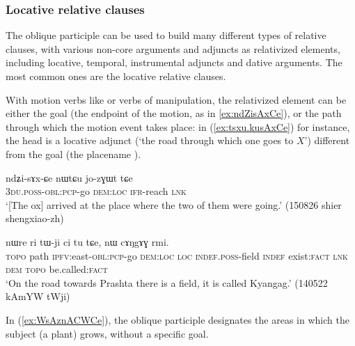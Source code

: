 \subsubsection{Locative relative clauses} \label{sec:locative.participle.relatives}
The oblique participle can be used to build many different types of relative clauses, with various non-core arguments and adjuncts as relativized elements, including locative, temporal, instrumental adjuncts and dative arguments. The most common ones are the locative relative clauses.

With  motion verbs like  or verbs of manipulation, the relativized element can be either the goal (the endpoint of the motion, as in \ref{ex:ndZisAxCe}), or the path through which the motion event takes place: in (\ref{ex:tsxu.kusAxCe}) for instance, the head  is a locative adjunct (`the road through which one goes to $X$') different from the goal (the placename ).

\begin{exe}
\ex \label{ex:ndZisAxCe}
\gll ndʑi-sɤx-ɕe nɯtɕu jo-zɣɯt tɕe \\
\textsc{3du}.\textsc{poss}-\textsc{obl}:\textsc{pcp}-go \textsc{dem}:\textsc{loc} \textsc{ifr}-reach \textsc{lnk} \\
\glt  `[The ox] arrived at the place where the two of them were going.' (150826 shier shengxiao-zh) 
\end{exe}

\begin{exe}
\ex \label{ex:tsxu.kusAxCe}
 nɯre ri tɯ-ji ci tu tɕe, nɯ cɤŋgɤɣ rmi. \\
\textsc{topo} path \textsc{ipfv}:east-\textsc{obl}:\textsc{pcp}-go \textsc{dem}:\textsc{loc} \textsc{loc} \textsc{indef}.\textsc{poss}-field \textsc{indef} exist:\textsc{fact} \textsc{lnk} \textsc{dem}  \textsc{topo} be.called:\textsc{fact} \\
\glt  `On the road towards Prashta there is a field, it is called Kyangag.' (140522 kAmYW tWji) 	
\end{exe}

In (\ref{ex:WsAznACWCe}), the oblique participle designates the areas in which the subject (a plant) grows, without a specific goal.

